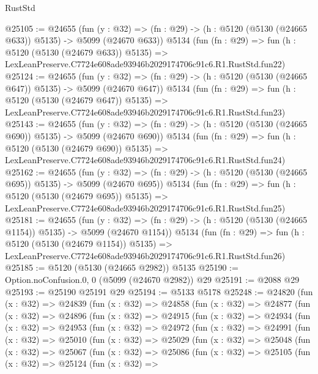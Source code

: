 \begin{lexlean}{RustStd}
\begin{coremodule}
@25105 := @24655
    (fun (y : @32) => (fn : @29) -> (h : @5120 (@5130 (@24665 @633)) @5135) -> @5099 (@24670 @633))
    @5134
    (fun (fn : @29) =>
    fun (h : @5120 (@5130 (@24679 @633)) @5135) =>
    LexLeanPreserve.C7724e608ade93946b2029174706c91c6.R1.RustStd.fun22)
@25124 := @24655
    (fun (y : @32) => (fn : @29) -> (h : @5120 (@5130 (@24665 @647)) @5135) -> @5099 (@24670 @647))
    @5134
    (fun (fn : @29) =>
    fun (h : @5120 (@5130 (@24679 @647)) @5135) =>
    LexLeanPreserve.C7724e608ade93946b2029174706c91c6.R1.RustStd.fun23)
@25143 := @24655
    (fun (y : @32) => (fn : @29) -> (h : @5120 (@5130 (@24665 @690)) @5135) -> @5099 (@24670 @690))
    @5134
    (fun (fn : @29) =>
    fun (h : @5120 (@5130 (@24679 @690)) @5135) =>
    LexLeanPreserve.C7724e608ade93946b2029174706c91c6.R1.RustStd.fun24)
@25162 := @24655
    (fun (y : @32) => (fn : @29) -> (h : @5120 (@5130 (@24665 @695)) @5135) -> @5099 (@24670 @695))
    @5134
    (fun (fn : @29) =>
    fun (h : @5120 (@5130 (@24679 @695)) @5135) =>
    LexLeanPreserve.C7724e608ade93946b2029174706c91c6.R1.RustStd.fun25)
@25181 := @24655
    (fun (y : @32) =>
    (fn : @29) -> (h : @5120 (@5130 (@24665 @1154)) @5135) -> @5099 (@24670 @1154))
    @5134
    (fun (fn : @29) =>
    fun (h : @5120 (@5130 (@24679 @1154)) @5135) =>
    LexLeanPreserve.C7724e608ade93946b2029174706c91c6.R1.RustStd.fun26)
@25185 := @5120 (@5130 (@24665 @2982)) @5135
@25190 := Option.noConfusion.{0, 0} (@5099 (@24670 @2982)) @29
@25191 := @2088 @29
@25193 := @25190 @25191 @29
@25194 := @5133 @5178
@25248 := @24820
    (fun (x : @32) =>
    @24839
      (fun (x : @32) =>
      @24858
        (fun (x : @32) =>
        @24877
          (fun (x : @32) =>
          @24896
            (fun (x : @32) =>
            @24915
              (fun (x : @32) =>
              @24934
                (fun (x : @32) =>
                @24953
                  (fun (x : @32) =>
                  @24972
                    (fun (x : @32) =>
                    @24991
                      (fun (x : @32) =>
                      @25010
                        (fun (x : @32) =>
                        @25029
                          (fun (x : @32) =>
                          @25048
                            (fun (x : @32) =>
                            @25067
                              (fun (x : @32) =>
                              @25086
                                (fun (x : @32) =>
                                @25105
                                  (fun (x : @32) =>
                                  @25124
                                    (fun (x : @32) =>

\end{coremodule}
\end{lexlean}

